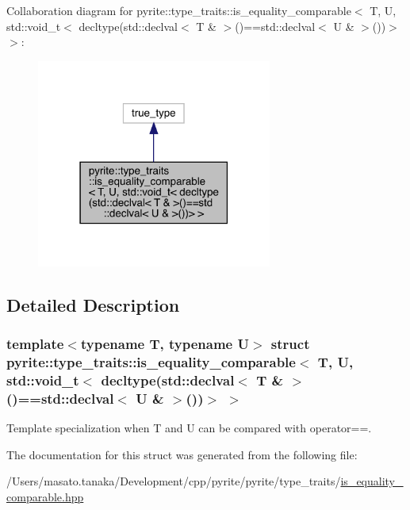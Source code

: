 Collaboration diagram for pyrite\+:\+:type\+\_\+traits\+:\+:is\+\_\+equality\+\_\+comparable$<$ T, U, std\+:\+:void\+\_\+t$<$ decltype(std\+:\+:declval$<$ T \& $>$()==std\+:\+:declval$<$ U \& $>$())$>$ $>$\+:
\nopagebreak
\begin{figure}[H]
\begin{center}
\leavevmode
\includegraphics[width=219pt]{dd/d31/structpyrite_1_1type__traits_1_1is__equality__comparable_3_01_t_00_01_u_00_01std_1_1void__t_3_01a799a9b256cbefbf5e3e39d0519e17bf}
\end{center}
\end{figure}


\subsection{Detailed Description}
\subsubsection*{template$<$typename T, typename U$>$\newline
struct pyrite\+::type\+\_\+traits\+::is\+\_\+equality\+\_\+comparable$<$ T, U, std\+::void\+\_\+t$<$ decltype(std\+::declval$<$ T \& $>$()==std\+::declval$<$ U \& $>$())$>$ $>$}

Template specialization when T and U can be compared with operator==. 

The documentation for this struct was generated from the following file\+:\begin{DoxyCompactItemize}
\item 
/\+Users/masato.\+tanaka/\+Development/cpp/pyrite/pyrite/type\+\_\+traits/\mbox{\hyperlink{is__equality__comparable_8hpp}{is\+\_\+equality\+\_\+comparable.\+hpp}}\end{DoxyCompactItemize}
